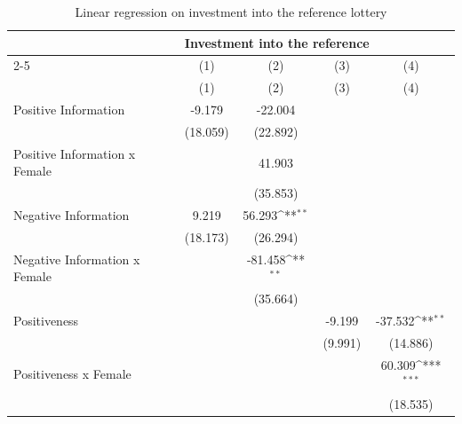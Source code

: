 \begin{table}[htbp]\centering
\def\sym#1{\ifmmode^{#1}\else\(^{#1}\)\fi}
\caption{Linear regression on investment into the reference lottery}
\begin{tabular}{l*{4}{c}}
\toprule
                    &\multicolumn{4}{l}{\textbf{Investment into the reference}}                             \\\cmidrule(lr){2-5}
                    &\multicolumn{1}{c}{(1)}&\multicolumn{1}{c}{(2)}&\multicolumn{1}{c}{(3)}&\multicolumn{1}{c}{(4)}\\
                    &\multicolumn{1}{c}{(1)}&\multicolumn{1}{c}{(2)}&\multicolumn{1}{c}{(3)}&\multicolumn{1}{c}{(4)}\\
\midrule
Positive Information&      -9.179         &     -22.004         &                     &                     \\
                    &    (18.059)         &    (22.892)         &                     &                     \\
\addlinespace
Positive Information x Female&                     &      41.903         &                     &                     \\
                    &                     &    (35.853)         &                     &                     \\
\addlinespace
Negative Information&       9.219         &      56.293\sym{**} &                     &                     \\
                    &    (18.173)         &    (26.294)         &                     &                     \\
\addlinespace
Negative Information x Female&                     &     -81.458\sym{**} &                     &                     \\
                    &                     &    (35.664)         &                     &                     \\
\addlinespace
Positiveness        &                     &                     &      -9.199         &     -37.532\sym{**} \\
                    &                     &                     &     (9.991)         &    (14.886)         \\
\addlinespace
Positiveness x Female&                     &                     &                     &      60.309\sym{***}\\
                    &                     &                     &                     &    (18.535)         \\

\end{tabular}
\end{table}

